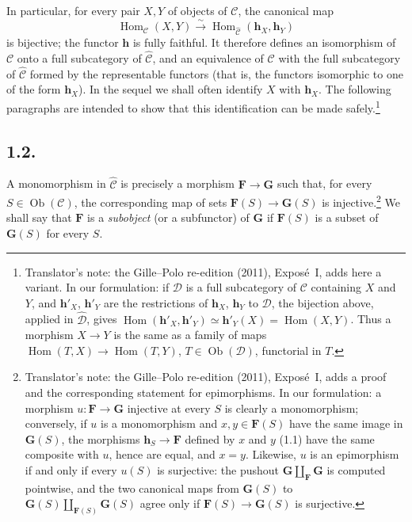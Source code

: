 In particular, for every pair \(X,Y\) of objects of \(\mathscr C\), the
canonical map
\[
  \operatorname{Hom}_{\mathscr C}(X,Y)
    \xrightarrow{\ \sim\ }
  \operatorname{Hom}_{\widehat{\mathscr C}}
    (\mathbf h_X,\mathbf h_Y)
\]
is bijective; the functor \(\mathbf h\) is fully faithful. It
therefore defines an isomorphism of \(\mathscr C\) onto a full subcategory of
\(\widehat{\mathscr C}\), and an equivalence of \(\mathscr C\) with the full
subcategory of \(\widehat{\mathscr C}\) formed by the representable functors
(that is, the functors isomorphic to one of the form \(\mathbf h_X\)). In the
sequel we shall often identify \(X\) with \(\mathbf h_X\). The following
paragraphs are intended to show that this identification can be made safely.\footnote{Translator's note: the Gille--Polo re-edition (2011), Exposé~I, adds here a
variant. In our formulation: if \(\mathscr D\) is a full subcategory of
\(\mathscr C\) containing \(X\) and \(Y\), and \(\mathbf h'_X\),
\(\mathbf h'_Y\) are the restrictions of \(\mathbf h_X\), \(\mathbf h_Y\) to
\(\mathscr D\), the bijection above, applied in \(\widehat{\mathscr D}\),
gives \(\operatorname{Hom}(\mathbf h'_X,\mathbf h'_Y)\simeq\mathbf h'_Y(X)
=\operatorname{Hom}(X,Y)\). Thus a morphism \(X\to Y\) is the same as a
family of maps \(\operatorname{Hom}(T,X)\to\operatorname{Hom}(T,Y)\),
\(T\in\operatorname{Ob}(\mathscr D)\), functorial in \(T\).}

\subsection*{1.2.}

A monomorphism in \(\widehat{\mathscr C}\) is precisely a morphism
\(\mathbf F\to\mathbf G\) such that, for every
\(S\in\operatorname{Ob}(\mathscr C)\), the corresponding map of sets
\(\mathbf F(S)\to\mathbf G(S)\) is injective.\footnote{Translator's note: the Gille--Polo re-edition (2011), Exposé~I, adds a proof and
the corresponding statement for epimorphisms. In our formulation: a morphism
\(u:\mathbf F\to\mathbf G\) injective at every \(S\) is clearly a
monomorphism; conversely, if \(u\) is a monomorphism and
\(x,y\in\mathbf F(S)\) have the same image in \(\mathbf G(S)\), the
morphisms \(\mathbf h_S\to\mathbf F\) defined by \(x\) and \(y\) (1.1) have
the same composite with \(u\), hence are equal, and \(x=y\). Likewise,
\(u\) is an epimorphism if and only if every \(u(S)\) is surjective: the
pushout \(\mathbf G\amalg_{\mathbf F}\mathbf G\) is computed pointwise, and
the two canonical maps from \(\mathbf G(S)\) to
\(\mathbf G(S)\amalg_{\mathbf F(S)}\mathbf G(S)\) agree only if
\(\mathbf F(S)\to\mathbf G(S)\) is surjective.}
We shall say that \(\mathbf F\) is a \emph{subobject} (or a subfunctor) of
\(\mathbf G\) if \(\mathbf F(S)\) is a subset of \(\mathbf G(S)\) for every
\(S\).

